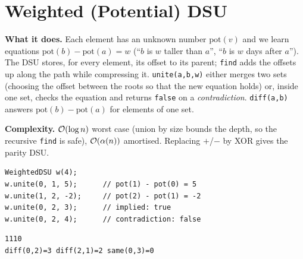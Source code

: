 \clneed
\section{Weighted (Potential) DSU}
\label{sec:cl-wdsu}

\textbf{What it does.} Each element has an unknown number $\mathrm{pot}(v)$ and we learn equations $\mathrm{pot}(b)-\mathrm{pot}(a)=w$ (``$b$ is $w$ taller than $a$'', ``$b$ is $w$ days after $a$''). The DSU stores, for every element, its offset to its parent; \texttt{find} adds the offsets up along the path while compressing it. \texttt{unite(a,b,w)} either merges two sets (choosing the offset between the roots so that the new equation holds) or, inside one set, checks the equation and returns \texttt{false} on a \emph{contradiction}. \texttt{diff(a,b)} answers $\mathrm{pot}(b)-\mathrm{pot}(a)$ for elements of one set.

\textbf{Complexity.} $\mathcal{O}(\log n)$ worst case (union by size bounds the depth, so the recursive \texttt{find} is safe), $\mathcal{O}(\alpha(n))$ amortised. Replacing $+$/$-$ by XOR gives the parity DSU.

\begin{diagrambox}
\end{diagrambox}

\begin{lstlisting}[style=snippet]
WeightedDSU w(4);
w.unite(0, 1, 5);      // pot(1) - pot(0) = 5
w.unite(1, 2, -2);     // pot(2) - pot(1) = -2
w.unite(0, 2, 3);      // implied: true
w.unite(0, 2, 4);      // contradiction: false
\end{lstlisting}
\begin{lstlisting}[style=trace]
1110
diff(0,2)=3 diff(2,1)=2 same(0,3)=0
\end{lstlisting}


